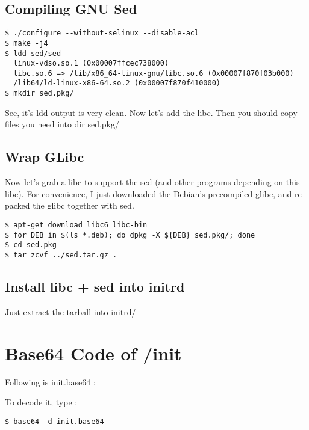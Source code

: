 \documentclass[10pt,a4paper]{article}
\begin{document}
\subsection{Compiling GNU Sed}
\begin{verbatim}
$ ./configure --without-selinux --disable-acl
$ make -j4
$ ldd sed/sed
  linux-vdso.so.1 (0x00007ffcec738000)
  libc.so.6 => /lib/x86_64-linux-gnu/libc.so.6 (0x00007f870f03b000)
  /lib64/ld-linux-x86-64.so.2 (0x00007f870f410000)
$ mkdir sed.pkg/
\end{verbatim}
See, it's ldd output is very clean. Now let's add the libc.\newline
Then you should copy files you need into dir sed.pkg/

\subsection{Wrap GLibc}
Now let's grab a libc to support the sed (and other programs depending on this libc).\newline
For convenience, I just downloaded the Debian's precompiled glibc, and re-packed the glibc together with sed.
\begin{verbatim}
$ apt-get download libc6 libc-bin
$ for DEB in $(ls *.deb); do dpkg -X ${DEB} sed.pkg/; done
$ cd sed.pkg
$ tar zcvf ../sed.tar.gz .
\end{verbatim}

\subsection{Install libc + sed into initrd}
Just extract the tarball into initrd/

\appendix
\newpage
\section{Base64 Code of /init}
Following is init.base64 :



To decode it, type :
\begin{verbatim}
$ base64 -d init.base64
\end{verbatim}

\newpage
\end{document}
